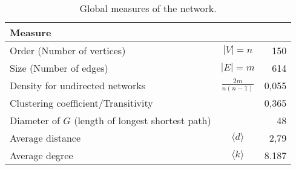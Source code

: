 \begin{table}[h]
    \centering
    \begin{tabular}{lcr}
    \toprule
    \textbf{Measure} & & \\
    \midrule
    Order (Number of vertices) & $|V| = n$	&	150 \\
    Size (Number of edges) & $|E| = m$	&	614 \\
    Density for undirected networks & $\tfrac{2m}{n(n-1)}$	&	0,055\\
    Clustering coefficient/Transitivity & &	0,365\\
    Diameter of $G$ (length of longest shortest path) & &	48\\
    Average distance & $\langle d \rangle$ &	2,79\\
    Average degree & $\langle k \rangle$ & 8.187\\
    \bottomrule
    \end{tabular}
    \caption{Global measures of the network.}
    \label{tab:globalmeasures}
\end{table}